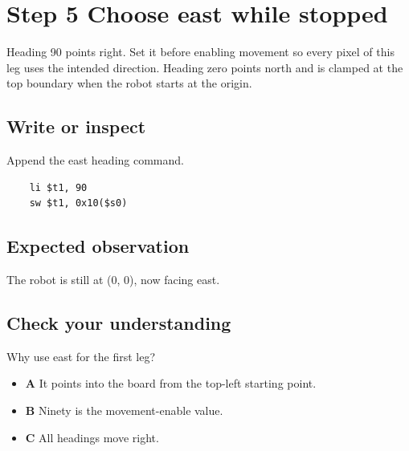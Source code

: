 \section{Step 5 Choose east while
  stopped}\label{006-marsbot-square-s05-step-5-choose-east-while-stopped}

Heading 90 points right. Set it before enabling movement so every pixel
of this leg uses the intended direction. Heading zero points north and
is clamped at the top boundary when the robot starts at the origin.

\subsection{Write or
  inspect}\label{006-marsbot-square-s05-write-or-inspect}

Append the east heading command.

\begin{verbatim}
    li $t1, 90
    sw $t1, 0x10($s0)
\end{verbatim}

\subsection{Expected
  observation}\label{006-marsbot-square-s05-expected-observation}

The robot is still at (0, 0), now facing east.

\subsection{Check your
  understanding}\label{006-marsbot-square-s05-check-your-understanding}

Why use east for the first leg?

\begin{itemize}
  \tightlist
  \item
        \textbf{A} It points into the board from the top-left starting point.
  \item
        \textbf{B} Ninety is the movement-enable value.
  \item
        \textbf{C} All headings move right.
\end{itemize}
